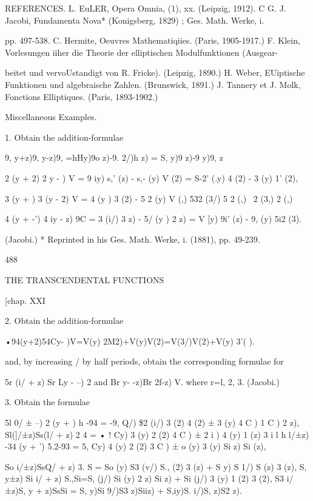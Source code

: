 REFERENCES. L. EuLER, Opera Omnia, (1), xx. (Leipzig, 1912). C G. J.
Jacobi, Fundamenta Nova* (Konigsberg, 1829) ; Ges. Math. Werke, i.

pp. 497-538. C. Hermite, Oeuvres Mathematiqiies. (Paris, 1905-1917.)
F. Klein, Vorlesungen iiher die Theorie der elliptischen
Modulfunktionen (Ausgear-

beitet und vervoUstandigt von R. Fricke). (Leipzig, 1890.) H. Weber,
EUiptische Funktionen und algebraische Zahlen. (Brunswick, 1891.) J.
Tannery et J. Molk, Fonctions Elliptiques. (Paris, 1893-1902.)

Miscellaneous Examples.

1. Obtain the addition-formulae

9, y+z)9, y-z)9, =hHy)9o z)-9. 2/)h z) = S, y)9 z)-9 y)9, z\

 2 (y + 2) 2 y - ) V = 9 iy) s,' (z) - s,- (y) V (2) = S-2' (.y) 4 (2)
- 3 (y) 1' (2),

 3 (y + ) 3 (y - 2) V = 4 (y ) 3 (2) - 5 2 (y) V (,) 532 (3/) 5 2 (,)
\ 2 (3,) 2 (,)

 4 (y + -') 4 iy - z) 9C = 3 (i/) 3 z) - 5/ (y ) 2 z) = V [y) 9i' (z)
- 9, (y) 5i2 (3).

(Jacobi.) * Reprinted in his Ges. Math. Werke, i. (1881), pp. 49-239.



488



THE TRANSCENDENTAL FUNCTIONS



[chap. XXI



2. Obtain the addition-formulae

•94(y+2)54Cy- )V=V(y) 2M2)+V(y)V(2)=V(3/)V(2)+V(y) 3'( ).

and, by increasing / by half periods, obtain the corresponding
formulae for

5r (i/ + z) Sr Ly - --) 2 and Br y- -z)Br 2f-z) V. where r=l, 2, 3.
(Jacobi.)

3. Obtain the formulae

5l 0/ ± --) 2 (y + ) h -94 = -9, Q/) \$2 (i/) 3 (2) 4 (2) ± 3 (y) 4 C
) 1 C ) 2 z), Sl(]/±z)Ss(l/ + z) 2 4 = • ! Cy) 3 (y) 2 (2) 4 C ) ± 2 i
) 4 (y) 1 (z) 3 i l h l/±z) -34 (y + ') 5.2-93 = 5, Cy) 4 (y) 2 (2) 3
C ) ± o (y) 3 (y) Si z) Si (z),

So i/±z)SsQ/ + z) 3. S = So (y) S3 (v/) S., (2) 3 (z) + S y) S 1/) S
(z) 3 (z), S, y±z) Si i/ + z) S.,Si=S, (j/) Si (y) 2 z) Si z) + Si
(j/) 3 (y) 1 (2) 3 (2), S3 i/±z)S, y + z)SsSi = S, y)Si 9/)S3 z)Siiz)
+ S,iy)S. i/)S, z)S2 z).

